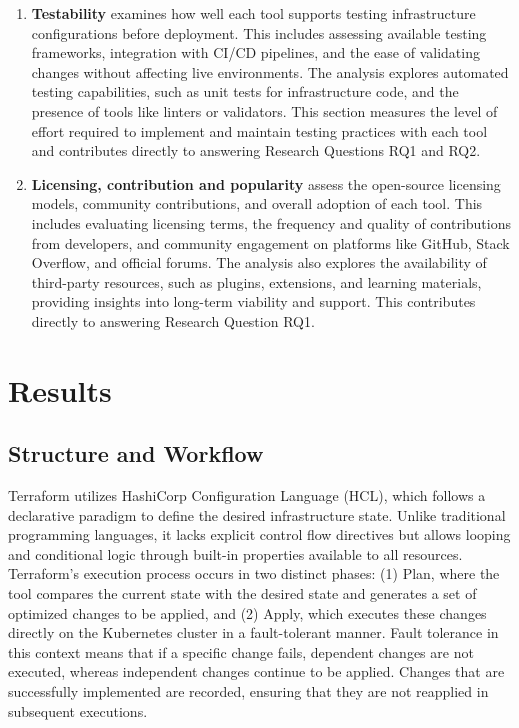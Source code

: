 \documentclass{article}
\begin{document}
\begin{enumerate}
\item \label{cs:tests} \textbf{Testability} examines how well each tool supports testing infrastructure configurations before deployment. This includes assessing available testing frameworks, integration with CI/CD pipelines, and the ease of validating changes without affecting live environments. The analysis explores automated testing capabilities, such as unit tests for infrastructure code, and the presence of tools like linters or validators. This section measures the level of effort required to implement and maintain testing practices with each tool and contributes directly to answering Research Questions RQ1 and RQ2.

\item \label{cs:usage} \textbf{Licensing, contribution and popularity} assess the open-source licensing models, community contributions, and overall adoption of each tool. This includes evaluating licensing terms, the frequency and quality of contributions from developers, and community engagement on platforms like GitHub, Stack Overflow, and official forums. The analysis also explores the availability of third-party resources, such as plugins, extensions, and learning materials, providing insights into long-term viability and support. This contributes directly to answering Research Question RQ1.

\end{enumerate}

\section{Results}
\label{sec:results}

\subsection{Structure and Workflow}
Terraform utilizes HashiCorp Configuration Language (HCL), which follows a declarative paradigm to define the desired infrastructure state. Unlike traditional programming languages, it lacks explicit control flow directives but allows looping and conditional logic through built-in properties available to all resources. Terraform's execution process occurs in two distinct phases: (1) Plan, where the tool compares the current state with the desired state and generates a set of optimized changes to be applied, and (2) Apply, which executes these changes directly on the Kubernetes cluster in a fault-tolerant manner. Fault tolerance in this context means that if a specific change fails, dependent changes are not executed, whereas independent changes continue to be applied. Changes that are successfully implemented are recorded, ensuring that they are not reapplied in subsequent executions.
\end{document}
